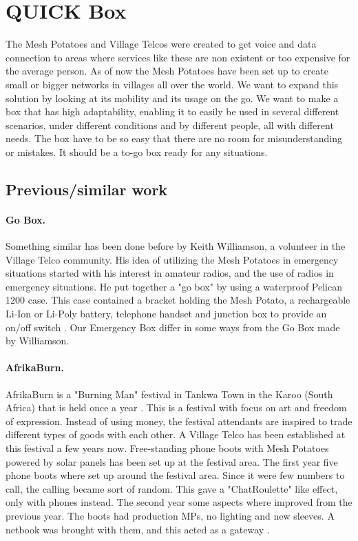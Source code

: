 \section{QUICK Box}
The Mesh Potatoes and Village Telcos were created to get voice and data connection to areas where services like these are non existent or too expensive for the average person. As of now the Mesh Potatoes have been set up to create small or bigger networks in villages all over the world. We want to expand this solution by looking at its mobility and its usage on the go. We want to make a box that has high adaptability, enabling it to easily be used in several different scenarios, under different conditions and by different people, all with different needs. The box have to be so easy that there are no room for misunderstanding or mistakes. It should be a to-go box ready for any situations.  
 
\subsection{Previous/similar work}
\paragraph{Go Box.} Something similar has been done before by Keith Williamson, a volunteer in the Village Telco community. His idea of utilizing the Mesh Potatoes in emergency situations started with his interest in amateur radios, and the use of radios in emergency situations. He put together a "go box" by using a waterproof Pelican 1200 case. This case contained a bracket holding the Mesh Potato, a rechargeable Li-Ion or Li-Poly battery, telephone handset and junction box to provide an on/off switch \cite{keith}. Our Emergency Box differ in some ways from the Go Box made by Williamson. 

\paragraph{AfrikaBurn.}
AfrikaBurn is a "Burning Man" festival in Tankwa Town in the Karoo (South Africa) that is held once a year \cite{whatisafrikaburn}. This is a festival with focus on art and freedom of expression. Instead of using money, the festival attendants are inspired to trade different types of goods with each other. A Village Telco has been established at this festival a few years now. Free-standing phone boots with Mesh Potatoes powered by solar panels has been set up at the festival area. The first year five phone boots where set up around the festival area. Since it were few numbers to call, the calling became sort of random. This gave a  "ChatRoulette" like effect, only with phones instead. The second year some aspects where improved from the previous year. The boots had production MPs, no lighting and new sleeves. A netbook was brought with them, and this acted as a gateway \cite{africaburnforavillagetelco,africaburnsagainforavillagetelco}. 

